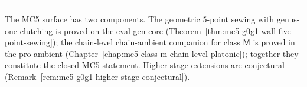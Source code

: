 \begin{center}
\rule{0.3\textwidth}{0.4pt}
\end{center}

The MC5 surface has two components. The geometric $5$-point sewing with
genus-one clutching is proved on the eval-gen-core
\textup{(}Theorem~\ref{thm:mc5-g0g1-wall-five-point-sewing}\textup{)};
the chain-level chain-ambient companion for class $\mathsf{M}$ is proved
in the pro-ambient \textup{(}Chapter~\ref{chap:mc5-class-m-chain-level-platonic}\textup{)};
together they constitute the closed MC5 statement. Higher-stage
extensions are conjectural
\textup{(}Remark~\ref{rem:mc5-g0g1-higher-stage-conjectural}\textup{)}.

